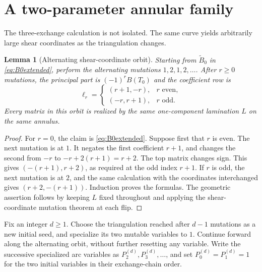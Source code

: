 \documentclass[11pt,letterpaper]{article}
\numberwithin{equation}{section}
\newtheorem{lemma}[theorem]{Lemma}
\theoremstyle{definition}
\newcommand{\Btilde}{\widetilde B}
\begin{document}
\section{A two-parameter annular family}\label{sec:family}

The three-exchange calculation is not isolated. The same curve yields
arbitrarily large shear coordinates as the triangulation changes.

\begin{lemma}[Alternating shear-coordinate orbit]\label{lem:orbit}
Starting from $\Btilde_0$ in \eqref{eq:B0extended}, perform the alternating
mutations $1,2,1,2,\ldots$. After $r\geq0$ mutations, the principal part is
$(-1)^rB(T_0)$ and the coefficient row is
\begin{equation}\label{eq:shearorbit}
 \ell_r=\begin{cases}
 (r+1,-r),&r\text{ even},\\
 (-r,r+1),&r\text{ odd}.
 \end{cases}
\end{equation}
Every matrix in this orbit is realized by the same one-component lamination
$L$ on the same annulus.
\end{lemma}
\begin{proof}
For $r=0$, the claim is \eqref{eq:B0extended}. Suppose first that $r$ is even.
The next mutation is at $1$. It negates the first coefficient $r+1$, and
changes the second from $-r$ to $-r+2(r+1)=r+2$. The top matrix changes sign.
This gives $(-(r+1),r+2)$, as required at the odd index $r+1$. If $r$ is odd,
the next mutation is at $2$, and the same calculation with the coordinates
interchanged gives $(r+2,-(r+1))$. Induction proves the formulas. The geometric
assertion follows by keeping $L$ fixed throughout and applying the
shear-coordinate mutation theorem at each flip.
\end{proof}

Fix an integer $d\geq1$. Choose the triangulation reached after $d-1$ mutations
as a new initial seed, and specialize its two mutable variables to $1$.
Continue forward along the alternating orbit, without further resetting any
variable. Write the successive specialized arc variables as
$P_2^{(d)},P_3^{(d)},\ldots$, and set $P_0^{(d)}=P_1^{(d)}=1$ for the two
initial variables in their exchange-chain order.
\end{document}
